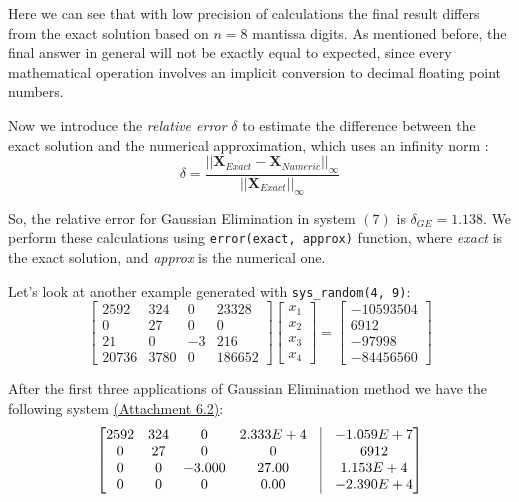 \documentclass[letterpaper,12pt]{article}
\begin{document}
Here we can see that with low precision of calculations the final result differs from the exact solution based on $n=8$ mantissa digits. As mentioned before, the final answer in general will not be exactly equal to expected, since every mathematical operation involves an implicit conversion to decimal floating point numbers.

Now we introduce the \textit{relative error} $\delta$ to estimate the difference between the exact solution and the numerical approximation, which uses an infinity norm \cite{error}:
\begin{equation}
    \delta = \frac{||\textbf{X}_{Exact} - \textbf{X}_{Numeric}||_{\infty}}{||\textbf{X}_{Exact}||_{\infty}}
\end{equation}

So, the relative error for Gaussian Elimination in system $(7)$ is $\delta_{GE} = 1.138$. We perform these calculations using \verb|error(exact, approx)| function, where \emph{exact} is the exact solution, and \emph{approx} is the numerical one.

Let's look at another example generated with \verb|sys_random(4, 9)|:
\begin{equation}
    \begin{bmatrix}
        2592    &      324     &      0     &        23328\\
        0       &      27      &      0     &        0\\
        21      &      0       &      -3    &        216\\
        20736   &      3780    &      0     &        186652 
    \end{bmatrix}
    \begin{bmatrix}
        x_1\\
        x_2\\
        x_3\\
        x_4
    \end{bmatrix}
    =
    \begin{bmatrix}
        -10593504\\
        6912\\
        -97998\\
        -84456560
    \end{bmatrix}
\end{equation}

After the first three applications of Gaussian Elimination method we have the following system \hyperref[a:E2]{(Attachment 6.2)}:
\begin{equation}
    \begin{bmatrix}
        2592  &   324  &  0        &   2.333E+4  &\vrule  & -1.059E+7\\ 
        0     &   27   &  0        &   0         &\vrule  & 6912\\      
        0     &   0    &  -3.000   &   27.00     &\vrule  &  1.153E+4\\
        0     &   0    &  0        &   0.00      &\vrule  &  -2.390E+4
    \end{bmatrix}
\end{equation}
\end{document}
